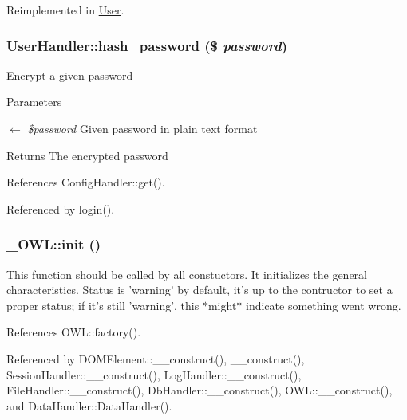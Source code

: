 Reimplemented in \hyperlink{classUser_a1348ddf190d4df2518665fb51305a902}{User}.

\subsubsection[{hash\_\-password}]{\setlength{\rightskip}{0pt plus 5cm}UserHandler::hash\_\-password (\$ {\em password})}\label{classUserHandler_a6b2bbbdb4f1a08578c219a933880a1de}
Encrypt a given password


\begin{DoxyParams}{Parameters}
\item[\mbox{$\leftarrow$} {\em \$password}]Given password in plain text format \end{DoxyParams}
\begin{DoxyReturn}{Returns}
The encrypted password 
\end{DoxyReturn}


References ConfigHandler::get().



Referenced by login().

\subsubsection[{init}]{\setlength{\rightskip}{0pt plus 5cm}\_\-OWL::init ()}\label{class__OWL_ae0ef3ded56e8a6b34b6461e5a721cd3e}
This function should be called by all constuctors. It initializes the general characteristics. Status is 'warning' by default, it's up to the contructor to set a proper status; if it's still 'warning', this $\ast$might$\ast$ indicate something went wrong. 

References OWL::factory().



Referenced by DOMElement::\_\-\_\-construct(), \_\-\_\-construct(), SessionHandler::\_\-\_\-construct(), LogHandler::\_\-\_\-construct(), FileHandler::\_\-\_\-construct(), DbHandler::\_\-\_\-construct(), OWL::\_\-\_\-construct(), and DataHandler::DataHandler().

